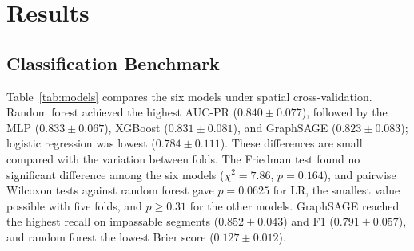 \section{Results}
\label{sec:results}

\subsection{Classification Benchmark}
Table~\ref{tab:models} compares the six models under spatial cross-validation. Random forest achieved the highest AUC-PR ($0.840 \pm 0.077$), followed by the MLP ($0.833 \pm 0.067$), XGBoost ($0.831 \pm 0.081$), and GraphSAGE ($0.823 \pm 0.083$); logistic regression was lowest ($0.784 \pm 0.111$). These differences are small compared with the variation between folds. The Friedman test found no significant difference among the six models ($\chi^2 = 7.86$, $p = 0.164$), and pairwise Wilcoxon tests against random forest gave $p = 0.0625$ for LR, the smallest value possible with five folds, and $p \ge 0.31$ for the other models. GraphSAGE reached the highest recall on impassable segments ($0.852 \pm 0.043$) and F1 ($0.791 \pm 0.057$), and random forest the lowest Brier score ($0.127 \pm 0.012$).

